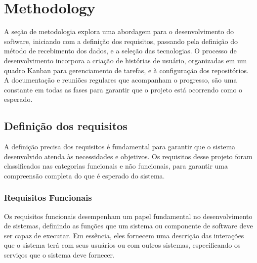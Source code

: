 



\chapter{Methodology}\label{cap:metodology}
A seção de metodologia explora uma abordagem para o desenvolvimento do software, iniciando com a definição dos requisitos, passando pela definição do método de recebimento dos dados, e a seleção das tecnologias. O processo de desenvolvimento incorpora a criação de histórias de usuário, organizadas em um quadro Kanban para gerenciamento de tarefas, e à configuração dos repositórios. A documentação e reuniões regulares que acompanham o progresso, são uma constante em todas as fases para garantir que o projeto está ocorrendo como o esperado.

\section[Definição dos requisitos]{Definição dos requisitos}
A definição precisa dos requisitos é fundamental para garantir que o sistema desenvolvido atenda às necessidades e objetivos. Os requisitos desse projeto foram classificados nas categorias funcionais e não funcionais, para garantir uma compreensão completa do que é esperado do sistema.

\subsection[Requisitos Funcionais]{Requisitos Funcionais}
Os requisitos funcionais desempenham um papel fundamental no desenvolvimento de sistemas, definindo as funções que um sistema ou componente de software deve ser capaz de executar. Em essência, eles fornecem uma descrição das interações que o sistema terá com seus usuários ou com outros sistemas, especificando os serviços que o sistema deve fornecer.

